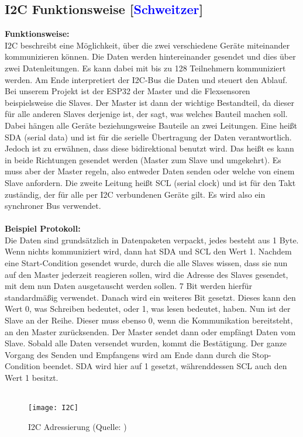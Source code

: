\documentclass[titlepage,12pt,twoside]{article}
\begin{document}
\subsection{I2C Funktionsweise [\textcolor{blue}{Schweitzer}]}
\label{chap:I2C Funktionsweise}
\textbf{Funktionsweise:} \\
I2C beschreibt eine Möglichkeit, über die zwei verschiedene Geräte miteinander 
kommunizieren können. Die Daten werden hintereinander gesendet und dies über zwei 
Datenleitungen. Es kann dabei mit bis zu 128 Teilnehmern kommuniziert werden. Am Ende 
interpretiert der I2C-Bus die Daten und steuert den Ablauf. Bei unserem Projekt ist 
der ESP32 der Master und die Flexsensoren beispielsweise die Slaves. Der Master ist 
dann der wichtige Bestandteil, da dieser für alle anderen Slaves derjenige ist, der 
sagt, was welches Bauteil machen soll. Dabei hängen alle Geräte beziehungsweise 
Bauteile an zwei Leitungen. Eine heißt SDA (serial data) und ist für die serielle 
Übertragung der Daten verantwortlich. Jedoch ist zu erwähnen, dass diese bidirektional 
benutzt wird. Das heißt es kann in beide Richtungen gesendet werden (Master zum 
Slave und umgekehrt). Es muss aber der Master regeln, also entweder Daten senden 
oder welche von einem Slave anfordern. Die zweite Leitung heißt SCL (serial clock) 
und ist für den Takt zuständig, der für alle per I2C verbundenen Geräte gilt. Es 
wird also ein synchroner Bus verwendet. \\
\\
\textbf{Beispiel Protokoll:} \\
Die Daten sind grundsätzlich in Datenpaketen verpackt, jedes besteht aus 1 Byte. 
Wenn nichts kommuniziert wird, dann hat SDA und SCL den Wert 1. Nachdem eine 
Start-Condition gesendet wurde, durch die alle Slaves wissen, dass sie nun auf den 
Master jederzeit reagieren sollen, wird die Adresse des Slaves gesendet, mit dem 
nun Daten ausgetauscht werden sollen. 7 Bit werden hierfür standardmäßig verwendet. 
Danach wird ein weiteres Bit gesetzt. Dieses kann den Wert 0, was Schreiben bedeutet, 
oder 1, was lesen bedeutet, haben. Nun ist der Slave an der Reihe. Dieser muss 
ebenso 0, wenn die Kommunikation bereitsteht, an den Master zurücksenden. Der Master 
sendet dann oder empfängt Daten vom Slave. Sobald alle Daten versendet wurden, 
kommt die Bestätigung. Der ganze Vorgang des Senden und Empfangens wird am Ende 
dann durch die Stop-Condition beendet. SDA wird hier auf 1 gesetzt, währenddessen 
SCL auch den Wert 1 besitzt. \\
\\
\begin{figure}[H]
	\begin{center}
		\scalebox{1.2}
		{\texttt{[image: I2C]}}
		\caption{I2C Adressierung (Quelle: \textcolor{blue}{\cite{I2Cabbildung}})}
		\label{fig:I2C}		
	\end{center}
\end{figure}
\hfill \break
\end{document}
